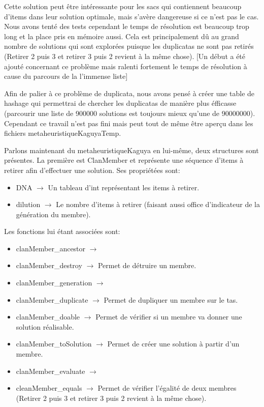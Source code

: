 \documentclass{EPUProjetPeiP}
\begin{document}
Cette solution peut être intéressante pour les sacs qui contiennent beaucoup d'items dans leur solution optimale, mais s'avère dangereuse si ce n'est pas le cas. Nous avons tenté des tests cependant le temps de résolution est beaucoup trop long et la place pris en mémoire aussi. Cela est principalement dû au grand nombre de solutions qui sont explorées puisque les duplicatas ne sont pas retirés (Retirer 2 puis 3 et retirer 3 puis 2 revient à la même chose). [Un début a été ajouté concernant ce problème mais ralenti fortement le temps de résolution à cause du parcours de la l'immense liste]

Afin de palier à ce problème de duplicata, nous avons pensé à créer une table de hashage qui permettrai de chercher les duplicatas de manière plus éfficasse (parcourir une liste de 900000 solutions est toujours mieux qu'une de 90000000). Cependant ce travail n'est pas fini mais peut tout de même être aperçu dans les fichiers metaheuristiqueKaguyaTemp.

Parlons maintenant du metaheuristiqueKaguya en lui-même, deux structures sont présentes. La première est ClanMember et représente une séquence d'items à retirer afin d'effectuer une solution. Ses propriétées sont:
\begin{itemize}
	\item DNA $\longrightarrow$ Un tableau d'int représentant les items à retirer.
	\item dilution $\longrightarrow$ Le nombre d'items à retirer (faisant aussi office d'indicateur de la génération du membre).\\
\end{itemize}

Les fonctions lui étant associées sont:
\begin{itemize}
	\item clanMember\_ancestor $\longrightarrow$ %
	\item clanMember\_destroy $\longrightarrow$ Permet de détruire un membre.
	\item clanMember\_generation $\longrightarrow$ %
	\item clanMember\_duplicate $\longrightarrow$ Permet de dupliquer un membre sur le tas.
	\item clanMember\_doable $\longrightarrow$ Permet de vérifier si un membre va donner une solution réalisable.
	\item clanMember\_toSolution $\longrightarrow$ Permet de créer une solution à partir d'un membre.
	\item clanMember\_evaluate $\longrightarrow$ %
	\item cleanMember\_equals $\longrightarrow$ Permet de vérifier l'égalité de deux membres (Retirer 2 puis 3 et retirer 3 puis 2 revient à la même chose).\\
\end{itemize}
\end{document}
